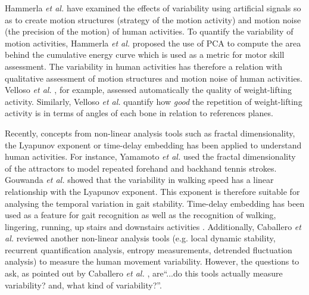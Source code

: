 \documentclass[10pt,journal,compsoc]{IEEEtran}
\begin{document}
Hammerla \emph{et al.} \cite{hammerla2011} have examined the effects of
variability using artificial signals so as to create motion structures (strategy of 
the motion activity) and motion noise (the precision of the motion) of human activities. 
To quantify the variability of motion activities, Hammerla \emph{et al.} 
\cite{hammerla2011} proposed the use of PCA to compute the area behind 
the cumulative energy curve which is used as a metric for motor skill assessment.
The variability in human activities has therefore a relation with qualitative assessment
of motion structures and motion noise of human activities.
Velloso \emph{et al.} \cite{Velloso2013a}, for example, assessed automatically the quality 
of weight-lifting activity.
Similarly, Velloso \emph{et al.} \cite{Velloso2013b} quantify how \textit{good} the repetition of 
weight-lifting activity is in terms of angles of each bone in relation to references planes. 

Recently, concepts from non-linear analysis tools such as fractal dimensionality, 
the Lyapunov exponent or time-delay embedding has been applied to understand human activities.
For instance, Yamamoto \emph{et al.} \cite{Suzuki2013, Yamamoto2000} used the fractal dimensionality 
of the attractors to model repeated forehand and backhand tennis strokes.
Gouwanda \emph{et al.} \cite{Gouwanda2012} showed that the variability in walking speed 
has a linear relationship with the Lyapunov exponent. This exponent is therefore suitable 
for analysing the temporal variation in gait stability.
Time-delay embedding has been used as a feature 
for gait recognition \cite{Sama2013} as well as the recognition of walking, lingering, 
running, up stairs and downstairs activities \cite{Frank2010}.
Additionally,  Caballero \emph{et al.} \cite{Caballero2014} reviewed 
another non-linear analysis tools
(e.g. local dynamic stability, recurrent quantification analysis, entropy measurements,
detrended fluctuation analysis) to measure the human movement variability. 
However, the questions to ask, as pointed out by Caballero \emph{et al.} \cite{Caballero2014}, 
are``...do this tools actually measure variability? and, what kind of variability?''.
\end{document}
